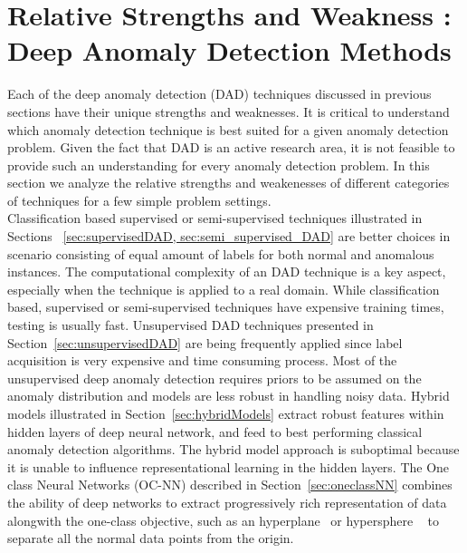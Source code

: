 \section{ Relative Strengths and Weakness : Deep Anomaly Detection Methods}
\label{sec:relativeSOW}
Each of the deep anomaly detection (DAD) techniques discussed in previous
sections have their unique strengths and weaknesses. It is critical to understand which
anomaly detection technique is best suited for a given anomaly detection problem.
Given the fact that DAD is an active research area, it is not feasible to provide such an
understanding for every anomaly detection problem. In this section we analyze the
relative strengths and weakenesses of different categories of techniques for a few
simple problem settings.\\
Classification based supervised  or semi-supervised techniques illustrated in Sections ~\ref{sec:supervisedDAD, sec:semi_supervised_DAD} are  better choices in scenario consisting of equal amount of labels for both normal and anomalous instances. The computational complexity of an DAD technique is a key aspect, especially when the technique is applied to a real domain. While classification
based, supervised or semi-supervised techniques have expensive training times, testing is usually fast. Unsupervised DAD techniques presented in Section~\ref{sec:unsupervisedDAD} are being frequently applied since
label acquisition is very expensive and time consuming process. Most of the unsupervised deep anomaly detection requires priors to be assumed on the anomaly distribution and models are less robust in handling noisy data. Hybrid models illustrated in Section~\ref{sec:hybridModels} extract robust features within hidden layers of deep neural network, and feed to best performing classical anomaly detection algorithms. The hybrid model approach is suboptimal because it is unable to influence representational learning in the hidden layers.  The One class Neural Networks  (OC-NN) described in Section~\ref{sec:oneclassNN} combines the ability of deep networks to extract progressively rich representation of data alongwith the one-class objective, such as an hyperplane~\cite{chalapathy2018anomaly} or hypersphere ~\cite{ruff2018deep} to separate all the normal data points from the origin.





